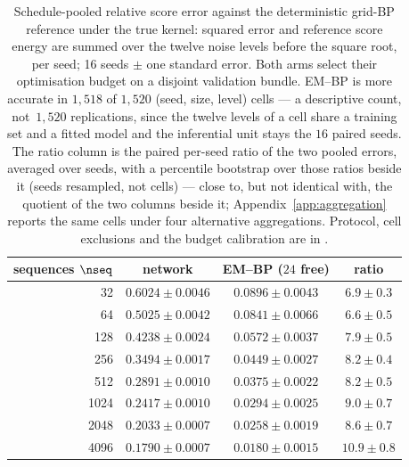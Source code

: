 
\begin{table}[!htbp]
\caption[Relative denoising error against training-set size]{Schedule-pooled relative score error against the deterministic grid-BP
reference under the true kernel: squared error and reference score energy are summed over the
twelve noise levels before the square root, per seed; 16 seeds $\pm$ one standard error.
Both arms select their optimisation budget on a disjoint validation bundle. EM--BP is
more accurate in $1{,}518$ of $1{,}520$ (seed, size, level) cells --- a
descriptive count, not $\,1{,}520$ replications, since the twelve levels of a
cell share a training set and a fitted model and the inferential unit stays the
$16$ paired seeds. The ratio
column is the paired per-seed ratio of the two pooled errors, averaged over seeds,
with a percentile bootstrap over those ratios beside it (seeds resampled, not
cells) --- close to, but
not identical with, the quotient of the two columns beside it;
Appendix~\ref{app:aggregation} reports the same cells under four alternative aggregations.
Protocol, cell exclusions and the budget calibration are in \provenanceappendix.}
\label{tab:pointwise}
\centering
\setlength{\tabcolsep}{4pt}
\begin{tabular}{rccc}
\toprule
sequences $\nseq$ & network & EM--BP ($24$ free) & ratio \\
\midrule
32   & $0.6024 \pm 0.0046$ & $\mathbf{0.0896 \pm 0.0043}$ & $6.9 \pm 0.3$ \\
64   & $0.5025 \pm 0.0042$ & $\mathbf{0.0841 \pm 0.0066}$ & $6.6 \pm 0.5$ \\
128  & $0.4238 \pm 0.0024$ & $\mathbf{0.0572 \pm 0.0037}$ & $7.9 \pm 0.5$ \\
256  & $0.3494 \pm 0.0017$ & $\mathbf{0.0449 \pm 0.0027}$ & $8.2 \pm 0.4$ \\
512  & $0.2891 \pm 0.0010$ & $\mathbf{0.0375 \pm 0.0022}$ & $8.2 \pm 0.5$ \\
1024 & $0.2417 \pm 0.0010$ & $\mathbf{0.0294 \pm 0.0025}$ & $9.0 \pm 0.7$ \\
2048 & $0.2033 \pm 0.0007$ & $\mathbf{0.0258 \pm 0.0019}$ & $8.6 \pm 0.7$ \\
4096 & $0.1790 \pm 0.0007$ & $\mathbf{0.0180 \pm 0.0015}$ & $10.9 \pm 0.8$ \\
\bottomrule
\end{tabular}
\end{table}

